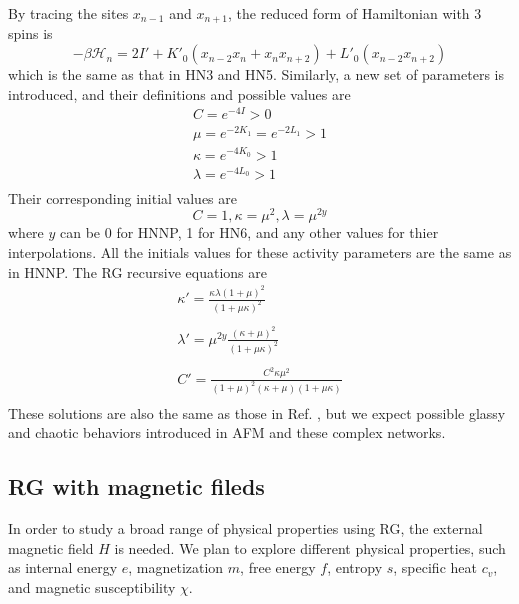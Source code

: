 By tracing the sites $x_{n-1}$ and $x_{n+1}$, the reduced form of Hamiltonian with 3 spins is
\begin{equation}
\label{eq:hnnpz1}
 -\beta \mathcal{H}_n = 2I' +  K'_0 \left(x_{n-2}x_{n} +  x_{n}x_{n+2}\right) + L'_0(x_{n-2}x_{n+2})
 \end{equation}
 which is the same as that in HN3 and HN5. Similarly, a new set of parameters is introduced, and their definitions and possible values are  
 \begin{equation}
\begin{array}{l}
\displaystyle C = e^{-4I} > 0   \\
\displaystyle \mu = e^{-2K_1} = e^{-2L_1} > 1 \\
\displaystyle \kappa = e^{-4K_0} > 1 \\
\displaystyle \lambda = e^{-4L_0}  > 1\\
\end{array} 
\label{eq:hn35-activities}
\end{equation}
Their corresponding initial values are 
 \begin{equation}
 C = 1,  \kappa = \mu^2,  \lambda =  \mu^{2y} 
\label{eq:hp-init2}
\end{equation}
where $y$ can be 0 for HNNP, 1 for HN6, and any other values for thier interpolations. All the initials values for these activity parameters are the same as in HNNP. The RG recursive equations are
\begin{equation}
\begin{array}{l}
\displaystyle \kappa' = \frac{\kappa \lambda (1+\mu)^2 }{(1+\mu\kappa)^2} \\
\\
\displaystyle \lambda' =\mu^{2y} \frac{(\kappa + \mu)^2} {(1 + \mu \kappa)^2} \\ \\
\displaystyle C' =  \frac{C^2 \kappa\mu^2} {(1+\mu)^2 (\kappa+\mu) (1+ \mu\kappa)}   \\
\end{array} 
\label{eq:afm-hpsol1}
\end{equation}
These solutions are also the same as those in Ref. \cite{Boettcher2011HNNP}, but we expect possible glassy and chaotic behaviors introduced in AFM and these complex networks.


\subsection{RG with magnetic fileds}
In order to study a broad range of physical properties using RG, the external magnetic field $H$ is needed. We plan to explore different physical properties, such as internal energy $e$, magnetization $m$, free energy $f$, entropy $s$, specific heat $c_v$, and magnetic susceptibility $\chi$. 


